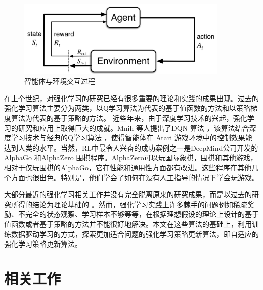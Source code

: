 \begin{figure}[h]
	\centering
	\includegraphics[width=0.9\textwidth]{image/chap01/interaction.png}
	\caption{智能体与环境交互过程\cite{suttonReinforcementLearningIntroduction2018}}
 	\label{fig:agent-env-interaction}
\end{figure}

在上个世纪，对强化学习的研究已经有很多重要的理论和实践的成果出现\cite{suttonReinforcementLearningIntroduction2018}。过去的强化学习算法主要分为两类，以Q学习\cite{watkinsQlearning1992}算法为代表的基于值函数的方法和以策略梯度\cite{mnihAsynchronousMethodsDeep2016}算法为代表的基于策略的方法。
近些年来，由于深度学习技术的兴起，强化学习的研究和应用上取得巨大的成就。Mnih 等人提出了DQN 算法\cite{mnihPlayingAtariDeep2013} \cite{mnihHumanlevelControlDeep2015}，该算法结合深度学习技术与经典的Q学习算法 \cite{watkinsQlearning1992}，使得智能体在 Atari 游戏环境中的控制效果能达到人类的水平。当然，RL中最令人兴奋的成功案例之一是DeepMind公司开发的AlphaGo \cite{silverMasteringGameGo2016} 和AlphaZero \cite{silverMasteringGameGo2017} 围棋程序。AlphaZero可以玩国际象棋，围棋和其他游戏，相对于仅玩围棋的AlphaGo，它在性能和通用性方面都有改进。这些程序在其他几个方面也很出色。特别是，他们学会了如何在没有人工指导的情况下学会玩游戏。

大部分最近的强化学习相关工作并没有完全脱离原来的研究成果，而是以过去的研究所得的结论为理论基础的 \cite{ohDiscoveringReinforcementLearning2020}。然而，强化学习实践上许多棘手的问题例如稀疏奖励、不完全的状态观察、学习样本不够等等，在根据理想假设的理论上设计的基于值函数或者基于策略的方法并不能很好地解决。本文在这些算法的基础上，利用训练数据驱动学习的方式，探索更加适合问题的强化学习策略更新算法，即自适应的强化学习策略更新算法。

\section{相关工作}
\label{sec:related-work}

